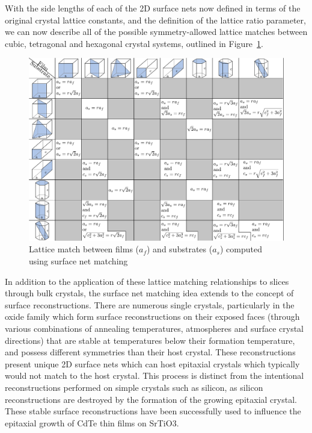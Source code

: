 \documentclass[final,5p,times,twocolumn]{elsarticle}
\begin{document}
With the side lengths of each of the 2D surface nets now defined in terms of the original crystal lattice constants, and the definition of the lattice ratio parameter, we can now describe all of the possible symmetry-allowed lattice matches between cubic, tetragonal and hexagonal crystal systems, outlined in Figure~\ref{fig:match_matrix}.
\begin{figure}
    \includegraphics[width=\textwidth]{graphics/grid2.pdf}
    \caption{Lattice match between films ($a_f$) and substrates ($a_s$) computed using surface net matching\label{fig:match_matrix}}
\end{figure}

In addition to the application of these lattice matching relationships to slices through bulk crystals, the surface net matching idea extends to the concept of surface reconstructions. There are numerous single crystals, particularly in the oxide family which form surface reconstructions on their exposed faces (through various combinations of annealing temperatures, atmospheres and surface crystal directions) that are stable at temperatures below their formation temperature, and possess different symmetries than their host crystal. These reconstructions present unique 2D surface nets which can host epitaxial crystals which typically would not match to the host crystal. This process is distinct from the intentional reconstructions performed on simple crystals such as silicon, as silicon reconstructions are destroyed by the formation of the growing epitaxial crystal. These stable surface reconstructions have been successfully used to influence the epitaxial growth of CdTe thin films on SrTiO3\cite{Neretina2009a}.
\end{document}
